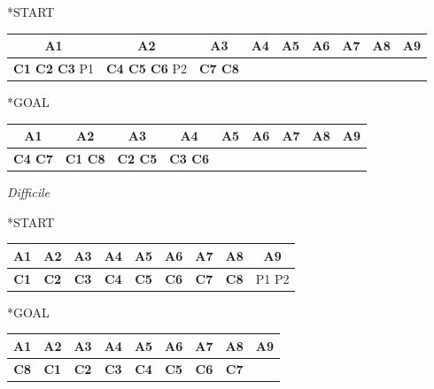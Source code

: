 \documentclass[a4paper,oneside,12pt]{book}
\begin{document}
    \begin{center}
        *{START}
        \begin{tabular}{|c | c| c | c | c | c | c | c |c |}
            \hline
            A1&A2&A3&A4&A5&A6&A7&A8&A9\\
            \hline
            \textbf{C1 C2 C3} P1 &\textbf{C4 C5 C6} P2&\textbf{C7 C8}&&&&&&\\
            \hline
        \end{tabular}

    \end{center}
    \begin{center}
        *{GOAL}
        \begin{tabular}{|c | c| c | c | c | c | c | c |c |}
            \hline
            A1&A2&A3&A4&A5&A6&A7&A8&A9\\
            \hline
            \textbf{C4 C7}&\textbf{C1 C8}&\textbf{C2 C5}&\textbf{C3 C6}&&&&&\\
            \hline
        \end{tabular}

    \end{center}

    \noindent \textit{Difficile}

        \begin{center}
            *{START}
            \begin{tabular}{|c | c| c | c | c | c | c | c |c |}
                \hline
                A1&A2&A3&A4&A5&A6&A7&A8&A9\\
                \hline
                \textbf{C1}  &\textbf{C2} &\textbf{C3}&\textbf{C4}&\textbf{C5}
                &\textbf{C6}&\textbf{C7}&\textbf{C8}&P1 P2\\
                \hline
            \end{tabular}

        \end{center}
        \begin{center}
            *{GOAL}
            \begin{tabular}{|c | c| c | c | c | c | c | c |c |}
                \hline
                A1&A2&A3&A4&A5&A6&A7&A8&A9\\
                \hline
                \textbf{C8}  &\textbf{C1} &\textbf{C2}&\textbf{C3}&\textbf{C4}
                &\textbf{C5}&\textbf{C6}&\textbf{C7}&\\
                \hline
            \end{tabular}

        \end{center}
\end{document}
